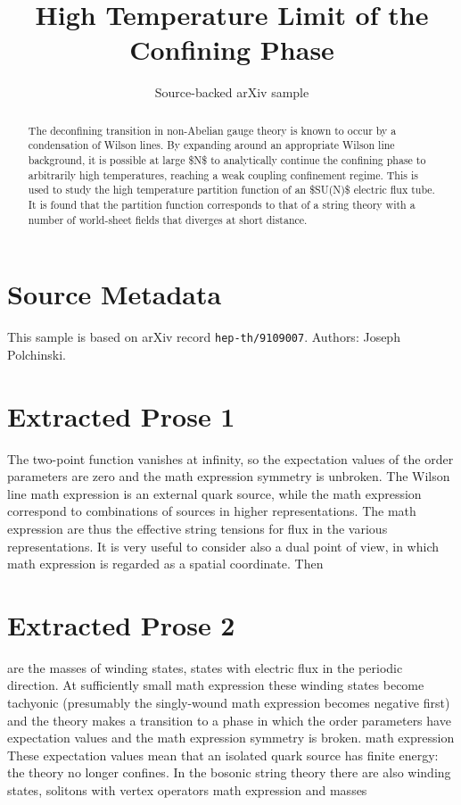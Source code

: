 \documentclass[11pt]{article}
\title{High Temperature Limit of the Confining Phase}
\author{Source-backed arXiv sample}
\date{}
\begin{document}
\maketitle
\begin{abstract}
The deconfining transition in non-Abelian gauge theory is known to occur by a condensation of Wilson lines. By expanding around an appropriate Wilson line background, it is possible at large \$N\$ to analytically continue the confining phase to arbitrarily high temperatures, reaching a weak coupling confinement regime. This is used to study the high temperature partition function of an \$SU(N)\$ electric flux tube. It is found that the partition function corresponds to that of a string theory with a number of world-sheet fields that diverges at short distance.
\end{abstract}
\section{Source Metadata}
This sample is based on arXiv record \texttt{hep-th/9109007}. Authors: Joseph Polchinski.
\section{Extracted Prose 1}
The two-point function vanishes at infinity, so the expectation values of the order parameters are zero and the math expression symmetry is unbroken. The Wilson line math expression is an external quark source, while the math expression correspond to combinations of sources in higher representations. The math expression are thus the effective string tensions for flux in the various representations. It is very useful to consider also a dual point of view, in which math expression is regarded as a spatial coordinate. Then
\section{Extracted Prose 2}
are the masses of winding states, states with electric flux in the periodic direction. At sufficiently small math expression these winding states become tachyonic (presumably the singly-wound math expression becomes negative first) and the theory makes a transition to a phase in which the order parameters have expectation values and the math expression symmetry is broken. math expression These expectation values mean that an isolated quark source has finite energy: the theory no longer confines. In the bosonic string theory there are also winding states, solitons with vertex operators math expression and masses
\end{document}
